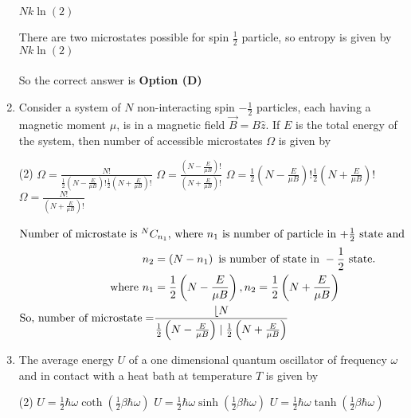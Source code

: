 \begin{enumerate}
\begin{tasks}
\task[\textbf{D.}] $N k \ln (2)$
\end{tasks}
\begin{answer}
There are two microstates possible for spin $\frac{1}{2}$ particle, so entropy is given by $N k \ln (2)$\\\\
So the correct answer is \textbf{Option (D)}
\end{answer}	
\item Consider a system of $N$ non-interacting spin $-\frac{1}{2}$ particles, each having a magnetic moment $\mu$, is in a magnetic field $\vec{B}=B \hat{z} .$ If $E$ is the total energy of the system, then number of accessible microstates $\Omega$ is given by
{}
\begin{tasks}(2)
\task[\textbf{A.}] $\Omega=\frac{N !}{\frac{1}{2}\left(N-\frac{E}{\mu B}\right) ! \frac{1}{2}\left(N+\frac{E}{\mu B}\right) !}$
\task[\textbf{B.}] $\Omega=\frac{\left(N-\frac{E}{\mu B}\right) !}{\left(N+\frac{E}{\mu B}\right) !}$
\task[\textbf{C.}] $\Omega=\frac{1}{2}\left(N-\frac{E}{\mu B}\right) ! \frac{1}{2}\left(N+\frac{E}{\mu B}\right) !$
\task[\textbf{D.}] $\Omega=\frac{N !}{\left(N+\frac{E}{\mu B}\right) !}$
\end{tasks}
\begin{answer}
\begin{align*}
\intertext{Number of microstate is ${ }^{N} C_{n_{1}}$, where $n_{1}$ is number of particle in $+\frac{1}{2}$ state and}
n_{2}&=\left(N-n_{1}\right)\text{ is number of state in }-\frac{1}{2}\text{ state.}\\
\text{	where }n_{1}&=\frac{1}{2}\left(N-\frac{E}{\mu B}\right), n_{2}=\frac{1}{2}\left(N+\frac{E}{\mu B}\right)\\
\text{So, number of microstate}=&\frac{\lfloor N}{\frac{1}{2}\left(N-\frac{E}{\mu B}\right) \mid \frac{1}{2}\left(N+\frac{E}{\mu B}\right)}
\end{align*}
\end{answer}	
\item The average energy $U$ of a one dimensional quantum oscillator of frequency $\omega$ and in contact with a heat bath at temperature $T$ is given by
{}
\begin{tasks}(2)
\task[\textbf{A.}] $U=\frac{1}{2} \hbar \omega \operatorname{coth}\left(\frac{1}{2} \beta \hbar \omega\right)$
\task[\textbf{B.}] $U=\frac{1}{2} \hbar \omega \sinh \left(\frac{1}{2} \beta \hbar \omega\right)$
\task[\textbf{C.}] $U=\frac{1}{2} \hbar \omega \tanh \left(\frac{1}{2} \beta \hbar \omega\right)$

\end{tasks}
\end{enumerate}
